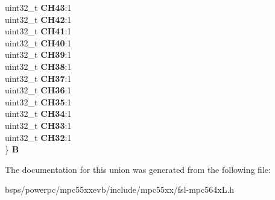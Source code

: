 \begin{DoxyCompactItemize}
\begin{tabbing}
\>uint32\_t {\bfseries CH43}:1\\
\>uint32\_t {\bfseries CH42}:1\\
\>uint32\_t {\bfseries CH41}:1\\
\>uint32\_t {\bfseries CH40}:1\\
\>uint32\_t {\bfseries CH39}:1\\
\>uint32\_t {\bfseries CH38}:1\\
\>uint32\_t {\bfseries CH37}:1\\
\>uint32\_t {\bfseries CH36}:1\\
\>uint32\_t {\bfseries CH35}:1\\
\>uint32\_t {\bfseries CH34}:1\\
\>uint32\_t {\bfseries CH33}:1\\
\>uint32\_t {\bfseries CH32}:1\\
\} {\bfseries B}\\

\end{tabbing}\end{DoxyCompactItemize}


The documentation for this union was generated from the following file\+:\begin{DoxyCompactItemize}
\item 
bsps/powerpc/mpc55xxevb/include/mpc55xx/fsl-\/mpc564x\+L.\+h\end{DoxyCompactItemize}
